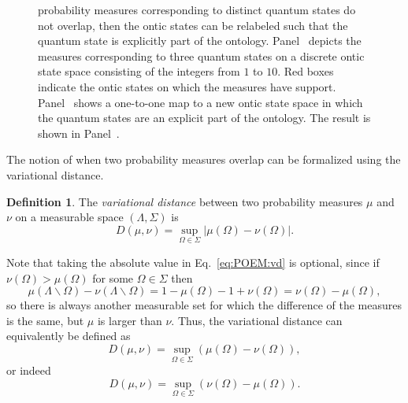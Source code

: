 \documentclass[DIV=calc,fontsize=12pt]{scrartcl} %
\theoremstyle{definition}
\newtheorem{definition}{Definition}[section]
\theoremstyle{plain}
\begin{document}
\begin{figure}[t!]
{{probability measures corresponding to distinct quantum states do
not overlap, then the ontic states can be relabeled such that the
quantum state is explicitly part of the ontology.
Panel~\protect{} depicts the measures
corresponding to three quantum states on a discrete ontic state
space consisting of the integers from $1$ to $10$.  Red boxes
indicate the ontic states on which the measures have support.
Panel~\protect{} shows a one-to-one
map to a new ontic state space in which the quantum states are an
explicit part of the ontology.  The result is shown in
Panel~\protect{}.}}
\end{figure}

The notion of when two probability measures overlap can be formalized
using the variational distance.
\begin{definition}
\label{def:POEM:vd}
The \emph{variational distance} between two probability measures
$\mu$ and $\nu$ on a measurable space $(\Lambda, \Sigma)$ is
\begin{equation}
\label{eq:POEM:vd}
D(\mu,\nu) = \sup_{\Omega \in \Sigma} \left | \mu(\Omega) -
\nu(\Omega) \right |.
\end{equation}
\end{definition}

Note that taking the absolute value in Eq.~\eqref{eq:POEM:vd} is
optional, since if $\nu(\Omega) > \mu(\Omega)$ for some $\Omega \in
\Sigma$ then
\begin{equation}
\mu(\Lambda \backslash \Omega) - \nu(\Lambda \backslash \Omega) =
1 - \mu(\Omega) - 1 + \nu(\Omega) = \nu(\Omega) - \mu(\Omega),
\end{equation}
so there is always another measurable set for which the difference of
the measures is the same, but $\mu$ is larger than $\nu$.  Thus, the
variational distance can equivalently be defined as
\begin{equation}
D(\mu,\nu) = \sup_{\Omega \in \Sigma} \left ( \mu(\Omega) -
\nu(\Omega) \right ),
\end{equation}
or indeed
\begin{equation}
D(\mu,\nu) = \sup_{\Omega \in \Sigma} \left ( \nu(\Omega) -
\mu(\Omega) \right ).
\end{equation}
\end{document}
